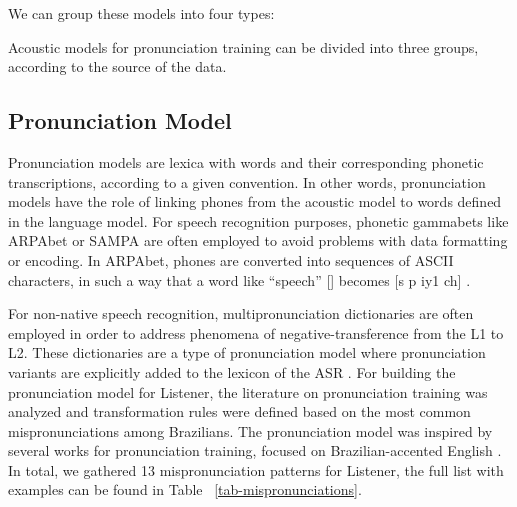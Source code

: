 \documentclass[twocolumn]{bmcart}%
\begin{document}
We can group these models into four types:


Acoustic models for pronunciation training can be divided into three groups,
according to the source of the data. 


\subsection*{\textbf{Pronunciation Model}}

Pronunciation models are lexica with words and their corresponding phonetic transcriptions, according to a given convention. In other words, pronunciation models have the role of linking phones from the acoustic model to words defined in the language model. For speech recognition purposes, phonetic gammabets like ARPAbet or SAMPA are often employed to avoid problems with data formatting or encoding. In ARPAbet, phones are converted into sequences of ASCII characters, in such a way that a word like ``speech'' [] becomes [s p iy1 ch] \cite{CMUDict2008}.

For non-native speech recognition, multipronunciation dictionaries are often employed in order to address phenomena of negative-transference from the L1 to L2. These dictionaries are a type of pronunciation model where pronunciation variants are explicitly added to the lexicon of the ASR \cite{Strik2001}. For building the pronunciation model for Listener, the literature on pronunciation training was analyzed and transformation rules were defined based on the most common mispronunciations among Brazilians. The pronunciation model was inspired by several works for pronunciation training, focused on Brazilian-accented English \citep{Zimmer2004, Zimmer2009, Cristofaro2015}. In total, we gathered 13 mispronunciation patterns for Listener, the full list with examples can be found in Table ~\ref{tab-mispronunciations}.
\end{document}
